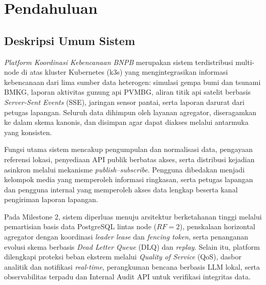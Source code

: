 \chapter{Pendahuluan}

\section{Deskripsi Umum Sistem}
\textit{Platform Koordinasi Kebencanaan BNPB} merupakan sistem terdistribusi multi-node di atas kluster Kubernetes (k3s) yang mengintegrasikan informasi kebencanaan dari lima sumber data heterogen: simulasi gempa bumi dan tsunami BMKG, laporan aktivitas gunung api PVMBG, aliran titik api satelit berbasis \textit{Server-Sent Events} (SSE), jaringan sensor pantai, serta laporan darurat dari petugas lapangan. Seluruh data dihimpun oleh layanan agregator, diseragamkan ke dalam skema kanonis, dan disimpan agar dapat diakses melalui antarmuka yang konsisten.

\vspace{1em}

\noindent Fungsi utama sistem mencakup pengumpulan dan normalisasi data, pengayaan referensi lokasi, penyediaan API publik berbatas akses, serta distribusi kejadian asinkron melalui mekanisme \textit{publish--subscribe}. Pengguna dibedakan menjadi kelompok media yang memperoleh informasi ringkasan, serta petugas lapangan dan pengguna internal yang memperoleh akses data lengkap beserta kanal pengiriman laporan lapangan.

\vspace{1em}

\noindent Pada Milestone 2, sistem diperluas menuju arsitektur berketahanan tinggi melalui pemartisian basis data PostgreSQL lintas node ($RF=2$), penskalaan horizontal agregator dengan koordinasi \textit{leader lease} dan \textit{fencing token}, serta penanganan evolusi skema berbasis \textit{Dead Letter Queue} (DLQ) dan \textit{replay}. Selain itu, platform dilengkapi proteksi beban ekstrem melalui \textit{Quality of Service} (QoS), dasbor analitik dan notifikasi \textit{real-time}, perangkuman bencana berbasis LLM lokal, serta observabilitas terpadu dan Internal Audit API untuk verifikasi integritas data.

